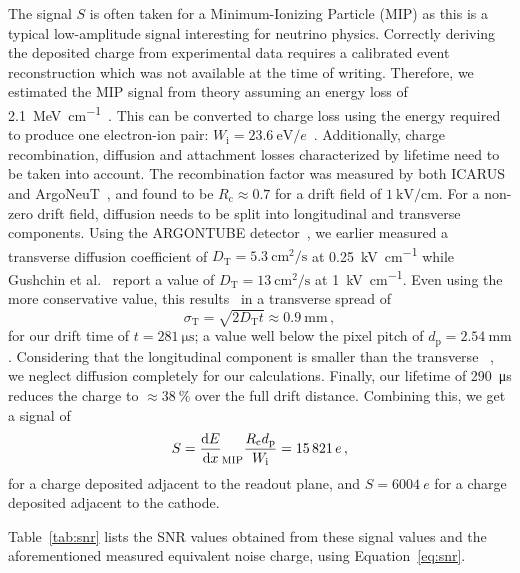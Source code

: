 \documentclass[instruments,article,accept,moreauthors,pdftex]{Definitions/mdpi}
\newcommand*{\m}{\mathrm}
\begin{document}
The signal $S$ is often taken for a Minimum-Ionizing Particle (MIP) as this is a typical low-amplitude signal interesting for neutrino physics.
Correctly deriving the deposited charge from experimental data requires a calibrated event reconstruction which was not available at the time of writing.
Therefore, we estimated the MIP signal from theory assuming an energy loss of \SI{2.1}{\mega\electronvolt\per\centi\metre}~\cite{pdg}.
This can be converted to charge loss using the energy required to produce one electron-ion pair: $W_{\m{i}} = \SI{23.6}{\electronvolt\per\elementarycharge}$~\cite{NobleGasDetectors}.
Additionally, charge recombination, diffusion and attachment losses characterized by lifetime need to be taken into account.
The recombination factor was measured by both ICARUS and ArgoNeuT~\cite{icarusReco, argoneutReco}, and found to be $R_{\m{c}} \approx 0.7$ for a drift field of $\SI{1}{\kilo\volt\per\centi\metre}$.
For a non-zero drift field, diffusion needs to be split into longitudinal and transverse components.
Using the ARGONTUBE detector~\cite{argontube}, we earlier measured a transverse diffusion coefficient of $D_{\m{T}} = \SI{5.3}{\centi\metre\squared\per\second}$ at \SI{0.25}{\kilo\volt\per\centi\metre} while Gushchin et al.~\cite{gushchin} report a value of $D_{\m{T}} = \SI{13}{\centi\metre\squared\per\second}$ at \SI{1}{\kilo\volt\per\centi\metre}.
Even using the more conservative value, this results~\cite{lngDet} in a transverse spread of
\begin{equation}
\sigma_{\m{T}} = \sqrt{2 D_{\m{T}} t} \approx \SI{0.9}{\milli\metre}\,, 
\end{equation}
for our drift time of $t = \SI{281}{\micro\second}$; a value well below the pixel pitch of $d_{\m{p}} = \SI{2.54}{\milli\metre}$.
Considering that the longitudinal component is smaller than the transverse ~\cite{lngDet}, we neglect diffusion completely for our calculations.
Finally, our lifetime of \SI{290}{\micro\second} reduces the charge to $\approx\SI{38}{\percent}$ over the full drift distance.
Combining this, we get a signal of 
\begin{equation}
S = \dv{E}{x}_{\m{MIP}} \frac{R_{\m{c}} d_{\m{p}}}{W_{\m{i}}} = \SI{15821}{\elementarycharge}\,,
\end{equation}
for a charge deposited adjacent to the readout plane, and $S = \SI{6004}{\elementarycharge}$ for a charge deposited adjacent to the cathode.

Table~\ref{tab:snr} lists the SNR values obtained from these signal values and the aforementioned measured equivalent noise charge, using Equation~\eqref{eq:snr}.
\end{document}
